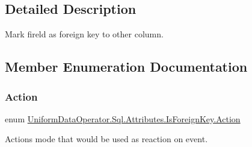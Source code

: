 \subsection{Detailed Description}
Mark fireld as foreign key to other column. 



\subsection{Member Enumeration Documentation}
\mbox{\label{class_uniform_data_operator_1_1_sql_1_1_attributes_1_1_is_foreign_key_a6039622384e2bbd1aa386e326ee0f850}} 
\subsubsection{\texorpdfstring{Action}{Action}}
{\footnotesize\ttfamily enum \mbox{\hyperlink{class_uniform_data_operator_1_1_sql_1_1_attributes_1_1_is_foreign_key_a6039622384e2bbd1aa386e326ee0f850}{Uniform\+Data\+Operator.\+Sql.\+Attributes.\+Is\+Foreign\+Key.\+Action}}\hspace{0.3cm}{\ttfamily [strong]}}



Action\textquotesingle{}s mode that would be used as reaction on event. 

